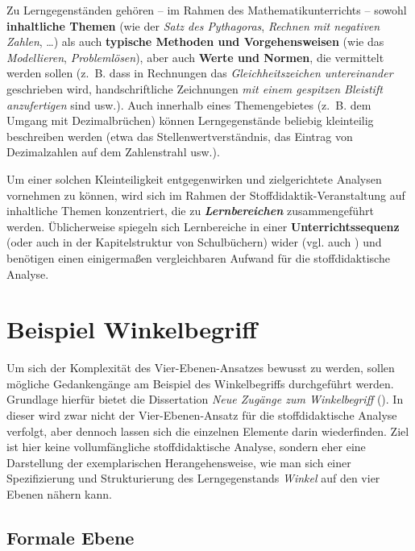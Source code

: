 \documentclass[
]{scrbook}
\theoremstyle{definition}
\theoremstyle{definition}
\theoremstyle{definition}
\theoremstyle{definition}
\theoremstyle{remark}
\begin{document}
Zu Lerngegenständen gehören -- im Rahmen des Mathematikunterrichts -- sowohl \textbf{inhaltliche Themen} (wie der \emph{Satz des Pythagoras}, \emph{Rechnen mit negativen Zahlen}, \ldots) als auch \textbf{typische Methoden und Vorgehensweisen} (wie das \emph{Modellieren}, \emph{Problemlösen}), aber auch \textbf{Werte und Normen}, die vermittelt werden sollen (z.~B. dass in Rechnungen das \emph{Gleichheitszeichen untereinander} geschrieben wird, handschriftliche Zeichnungen \emph{mit einem gespitzen Bleistift anzufertigen} sind usw.). Auch innerhalb eines Themengebietes (z.~B. dem Umgang mit Dezimalbrüchen) können Lerngegenstände beliebig kleinteilig beschreiben werden (etwa das Stellenwertverständnis, das Eintrag von Dezimalzahlen auf dem Zahlenstrahl usw.).

Um einer solchen Kleinteiligkeit entgegenwirken und zielgerichtete Analysen vornehmen zu können, wird sich im Rahmen der Stoffdidaktik-Veranstaltung auf inhaltliche Themen konzentriert, die zu \textbf{\emph{Lernbereichen}} zusammengeführt werden. Üblicherweise spiegeln sich Lernbereiche in einer \textbf{Unterrichtssequenz} (oder auch in der Kapitelstruktur von Schulbüchern) wider (vgl. auch ) und benötigen einen einigermaßen vergleichbaren Aufwand für die stoffdidaktische Analyse.

\section{Beispiel Winkelbegriff}\label{beispiel-winkelbegriff}

Um sich der Komplexität des Vier-Ebenen-Ansatzes bewusst zu werden, sollen mögliche Gedankengänge am Beispiel des Winkelbegriffs durchgeführt werden. Grundlage hierfür bietet die Dissertation \emph{Neue Zugänge zum Winkelbegriff} (). In dieser wird zwar nicht der Vier-Ebenen-Ansatz für die stoffdidaktische Analyse verfolgt, aber dennoch lassen sich die einzelnen Elemente darin wiederfinden. Ziel ist hier keine vollumfängliche stoffdidaktische Analyse, sondern eher eine Darstellung der exemplarischen Herangehensweise, wie man sich einer Spezifizierung und Strukturierung des Lerngegenstands \emph{Winkel} auf den vier Ebenen nähern kann.

\subsection{Formale Ebene}\label{formale-ebene}
\end{document}
